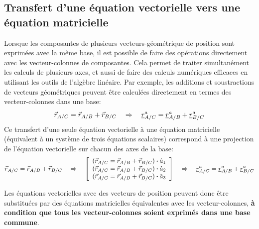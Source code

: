 \subsection{Transfert d'une équation vectorielle vers une équation matricielle} 
%
Lorsque les composantes de plusieurs vecteurs-géométrique de position sont exprimées avec la même base, il est possible de faire des opérations directement avec les vecteur-colonnes de composantes. Cela permet de traiter simultanément les calculs de plusieurs axes, et aussi de faire des calculs numériques efficaces en utilisant les outils de l'algèbre linéaire. Par exemple, les additions et soustractions de vecteurs géométriques peuvent être calculées directement en termes des vecteur-colonnes dans une base:
\begin{equation}
\vec{r}_{A/C}   = \vec{r}_{A/B} + \vec{r}_{B/C}   \quad \Rightarrow \quad
\underline{r}_{A/C}^a = \underline{r}_{A/B}^a + \underline{r}_{B/C}^a
\end{equation} 
Ce transfert d'une seule équation vectorielle à une équation matricielle (équivalent à un système de trois équations scalaires) correspond à une projection de l'équation vectorielle sur chacun des axes de la base:
\begin{equation}
\vec{r}_{A/C}   = \vec{r}_{A/B} + \vec{r}_{B/C}  
\quad \Rightarrow \quad
\left[ \begin{array}{c} (\vec{r}_{A/C}   = \vec{r}_{A/B} + \vec{r}_{B/C}   ) \boldsymbol{\cdot} \hat{a}_1 \\ (\vec{r}_{A/C}   = \vec{r}_{A/B} + \vec{r}_{B/C}   ) \boldsymbol{\cdot} \hat{a}_2 \\ (\vec{r}_{A/C}   = \vec{r}_{A/B} + \vec{r}_{B/C}  ) \boldsymbol{\cdot} \hat{a}_3  \end{array} \right] 
\quad \Rightarrow \quad
\underline{r}_{A/C}^a = \underline{r}_{A/B}^a + \underline{r}_{B/C}^a
\end{equation} 

Les équations vectorielles avec des vecteurs de position peuvent donc être substituées par des équations matricielles équivalentes avec les vecteur-colonnes,\textbf{ à condition que tous les vecteur-colonnes soient exprimés dans une base commune}. 
  


